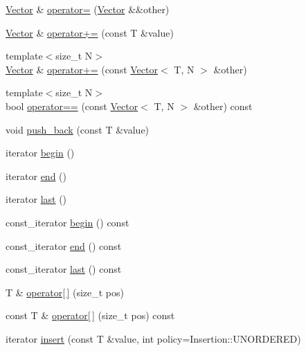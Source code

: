 \begin{DoxyCompactItemize}
\mbox{\hyperlink{class_concept_1_1_vector}{Vector}} \& \mbox{\hyperlink{class_concept_1_1_vector_a3a30dc7360a5e0a94a80fe760446690c}{operator=}} (\mbox{\hyperlink{class_concept_1_1_vector}{Vector}} \&\&other)
\item 
\mbox{\hyperlink{class_concept_1_1_vector}{Vector}} \& \mbox{\hyperlink{class_concept_1_1_vector_a53641dbb6e511072424b38ca2ffdeeda}{operator+=}} (const T \&value)
\item 
{\footnotesize template$<$size\+\_\+t N$>$ }\\\mbox{\hyperlink{class_concept_1_1_vector}{Vector}} \& \mbox{\hyperlink{class_concept_1_1_vector_ab05ae64ae1973bf0c115575cadd2ebd8}{operator+=}} (const \mbox{\hyperlink{class_concept_1_1_vector}{Vector}}$<$ T, N $>$ \&other)
\item 
{\footnotesize template$<$size\+\_\+t N$>$ }\\bool \mbox{\hyperlink{class_concept_1_1_vector_a62f543e01ccc500d04e85a70b81bbfb2}{operator==}} (const \mbox{\hyperlink{class_concept_1_1_vector}{Vector}}$<$ T, N $>$ \&other) const
\item 
void \mbox{\hyperlink{class_concept_1_1_vector_a561e80a9c94307340601b7ab2270e101}{push\+\_\+back}} (const T \&value)
\item 
iterator \mbox{\hyperlink{class_concept_1_1_vector_a118524e2ff65811ad0ad425153651a1f}{begin}} ()
\item 
iterator \mbox{\hyperlink{class_concept_1_1_vector_acf6f0b48aa0ecbd09e327d6b173d9ed8}{end}} ()
\item 
iterator \mbox{\hyperlink{class_concept_1_1_vector_a27a72907afb7223fe8a4f892000c8322}{last}} ()
\item 
const\+\_\+iterator \mbox{\hyperlink{class_concept_1_1_vector_a0291fef67540e069d5b58d22f37f165f}{begin}} () const
\item 
const\+\_\+iterator \mbox{\hyperlink{class_concept_1_1_vector_aa9a137bf9a8054ff5a5d543f45583fe5}{end}} () const
\item 
const\+\_\+iterator \mbox{\hyperlink{class_concept_1_1_vector_a6e0abe20c6601aafaa79581514243181}{last}} () const
\item 
T \& \mbox{\hyperlink{class_concept_1_1_vector_adb9742c5303dcae29b2b0bc933f52dec}{operator\mbox{[}$\,$\mbox{]}}} (size\+\_\+t pos)
\item 
const T \& \mbox{\hyperlink{class_concept_1_1_vector_a05d5953700c6b16d416be2b5bcc5a16e}{operator\mbox{[}$\,$\mbox{]}}} (size\+\_\+t pos) const
\item 
iterator \mbox{\hyperlink{class_concept_1_1_vector_abda5f983b8e539a72ea93e1a051d2b9c}{insert}} (const T \&value, int policy=Insertion\+::\+U\+N\+O\+R\+D\+E\+R\+ED)

\end{DoxyCompactItemize}
